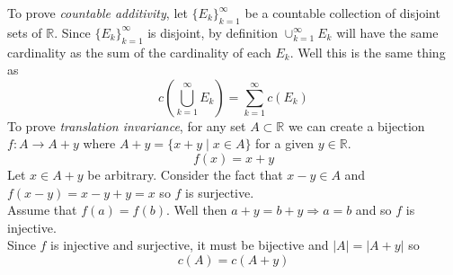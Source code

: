 \documentclass[11pt]{article}
\begin{document}
    To prove \emph{countable additivity}, let $\{ E_k \}_{k=1}^{\infty}$ be a countable collection of disjoint sets of $\mathbb{R}$.
    Since $\{ E_k \}_{k=1}^{\infty}$ is disjoint, by definition $\cup_{k=1}^{\infty} E_k$ will have the same cardinality as the sum of the cardinality of each $E_k$.
    Well this is the same thing as
    \[
        c \left( \bigcup_{k=1}^{\infty} E_k \right) = \sum_{k=1}^{\infty} c(E_k)
    \]
    To prove \emph{translation invariance}, for any set $A \subset \mathbb{R}$ we can create a bijection $f: A \rightarrow A+y$ where $A+y = \{ x+y \mid x \in A \}$ for a given $y \in \mathbb{R}$.
    \[
        f(x) = x+y
    \]
    Let $x \in A + y$ be arbitrary.
    Consider the fact that $x-y \in A$ and $f(x-y) = x - y + y = x$ so $f$ is surjective. \\

    Assume that $f(a) = f(b)$.
    Well then $a + y = b + y \Rightarrow a = b$ and so $f$ is injective.\\

    Since $f$ is injective and surjective, it must be bijective and $\lvert A \rvert = \lvert A+y \rvert$ so
    \[
        c(A) = c(A+y)
    \]
\end{document}
